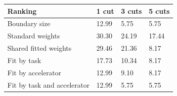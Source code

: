 \begin{tabular}{@{}llll@{}}
\toprule
Ranking & 1 cut & 3 cuts & 5 cuts \\
\midrule
Boundary size & 12.99 & 5.75 & 5.75 \\
Standard weights & 30.30 & 24.19 & 17.44 \\
Shared fitted weights & 29.46 & 21.36 & 8.17 \\
Fit by task & 17.73 & 10.34 & 8.17 \\
Fit by accelerator & 12.99 & 9.10 & 8.17 \\
Fit by task and accelerator & 12.99 & 5.75 & 5.75 \\
\bottomrule
\end{tabular}
